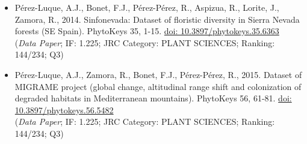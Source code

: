 {\begin{itemize}
    \item Pérez-Luque, A.J., Bonet, F.J., Pérez-Pérez, R., Aspizua, R., Lorite, J., Zamora, R., 2014. Sinfonevada: Dataset of floristic diversity in Sierra Nevada forests (SE Spain). PhytoKeys 35, 1-15. \href{https://doi.org/10.3897/phytokeys.35.6363}{doi: 10.3897/phytokeys.35.6363}\\
    (\emph{Data Paper}; IF: 1.225; JRC Category: PLANT SCIENCES; Ranking: 144/234; Q3)
    \item Pérez-Luque, A.J., Zamora, R., Bonet, F.J., Pérez-Pérez, R., 2015. Dataset of MIGRAME project (global change, altitudinal range shift and colonization of degraded habitats in Mediterranean mountains). PhytoKeys 56, 61-81. \href{https://doi.org/10.3897/phytokeys.56.5482}{doi: 10.3897/phytokeys.56.5482}\\
    (\emph{Data Paper}; IF: 1.225; JRC Category: PLANT SCIENCES; Ranking: 144/234; Q3)
\end{itemize}
}%
\normalsize



